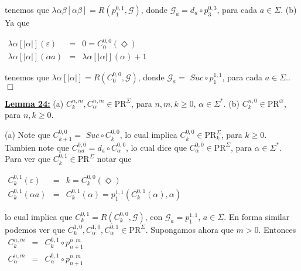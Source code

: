   tenemos que \(\lambda \alpha \beta \left[ \alpha \beta \right] =R\left( p_{1}^{0,1},\mathcal{G}\right) \), donde \(\mathcal{G}_{a}=d_{a}\circ p_{3}^{0,3}\), para cada \(a\in \Sigma \).
  (b) Ya que

  \(\displaystyle \begin{array}{rcl} \lambda \alpha \left[ \left\vert \alpha \right\vert \right] (\varepsilon ) & =& 0=C_{0}^{0,0}(\Diamond ) \\ \lambda \alpha \left[ \left\vert \alpha \right\vert \right] (\alpha a) & =& \lambda \alpha \left[ \left\vert \alpha \right\vert \right] (\alpha )+1 \end{array} \)

  tenemos que \(\lambda \alpha \left[ \left\vert \alpha \right\vert \right] =R\left( C_{0}^{0,0},\mathcal{G}\right) \), donde \(\mathcal{G}_{a}=\) \( Suc\circ p_{1}^{1,1}\), para cada \(a\in \Sigma .\). \(\Box\)


  \textbf{\underline{Lemma 24:}}
  (a) \(C_{k}^{n,m},C_{\alpha }^{n,m}\in \mathrm{PR}^{\Sigma }\), para \( n,m,k\geq 0\), \(\alpha \in \Sigma ^{\ast }\).
  (b) \(C_{k}^{n,0}\in \mathrm{PR}^{\varnothing }\), para \(n,k\geq 0\).


  \PROOF (a) Note que \(C_{k+1}^{0,0}=\) \(Suc\circ C_{k}^{0,0}\), lo cual implica \( C_{k}^{0,0}\in \mathrm{PR}_{k}^{\Sigma }\), para \(k\geq 0\). Tambien note que \( C_{\alpha a}^{0,0}=d_{a}\circ C_{\alpha }^{0,0}\), lo cual dice que \( C_{\alpha }^{0,0}\in \mathrm{PR}^{\Sigma }\), para \(\alpha \in \Sigma ^{\ast } \). Para ver que \(C_{k}^{0,1}\in \mathrm{PR}^{\Sigma }\) notar que

  \(\displaystyle \begin{array}{rcl} C_{k}^{0,1}(\varepsilon ) & =& k=C_{k}^{0,0}(\Diamond ) \\ C_{k}^{0,1}(\alpha a) & =& C_{k}^{0,1}(\alpha )=p_{1}^{1,1}\left( C_{k}^{0,1}(\alpha ),\alpha \right) \end{array} \)

  lo cual implica que \(C_{k}^{0,1}=R\left( C_{k}^{0,0},\mathcal{G}\right) \), con \(\mathcal{G}_{a}=p_{1}^{1,1}\), \(a\in \Sigma \). En forma similar podemos ver que \(C_{k}^{1,0},C_{\alpha }^{1,0},C_{\alpha }^{0,1}\in \mathrm{PR} ^{\Sigma }\). Supongamos ahora que \(m >0\). Entonces
  \(\displaystyle \begin{array}{rcl} C_{k}^{n,m} & =& C_{k}^{0,1}\circ p_{n+1}^{n,m} \\ C_{\alpha }^{n,m} & =& C_{\alpha }^{0,1}\circ p_{n+1}^{n,m} \end{array} \)

